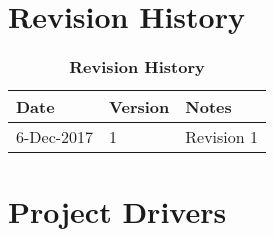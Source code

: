 \documentclass[12pt, titlepage]{article}
\newcommand{\revisionTable}{
	\begin{table}[hp]
		
		\begin{tabularx}{\textwidth}{p{3cm}p{2cm}X}
			\toprule {\bf Date} & {\bf Version} & {\bf Notes}\\
			\midrule
			
			6-Dec-2017 & 1 & Revision 1\\
			
			\bottomrule
		\end{tabularx}
	\caption{\bf Revision History}
	\end{table}
}
\begin{document}
	
	
	
	
	
	
	\def\thesection{\arabic{section}} 
	\renewcommand\thesection{\arabic{section}} 
	\renewcommand\thesubsection{\thesection.\arabic{subsection}}
	
	\tableofcontents
	
	\listoftables
	
	
	
	\newpage
	
	\section{Revision History}
	\revisionTable

	
	\section{Project Drivers}
\newcommand{\labelWidth}{55pt}
\newcommand{\descWidth}{5.13in}

	\newcommand{\pbox}[1]{\parbox[t]{\descWidth}{#1}}

	\newcommand{\labelbox}[1]{\parbox[t]{\labelWidth}{\textit{#1}}}
	\newcommand{\myline}{%
		\kern1pt %
		\hrule height 0.8pt
		\kern3pt %
	}


\newcommand\Tstrut{\rule{0pt}{0.5ex}}         %
\newcommand\Bstrut{\rule[-0.9ex]{0pt}{0pt}}   %
\end{document}
